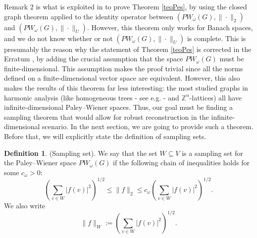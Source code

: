 \documentclass[12pt]{amsart}
\theoremstyle{definition}
\newtheorem{definition}[theorem]{Definition}
\numberwithin{equation}{section}
\theoremstyle{definition}
\theoremstyle{remark}
\numberwithin{equation}{section}
\begin{document}
Remark 2 is what is exploited in \cite{PW1} to prove Theorem \ref{teoPes}, by using the closed graph theorem applied to the identity operator between $(PW_\omega(G), \|\cdot\|_2)$ and $(PW_\omega(G), \|\cdot\|_U)$. However, this theorem only works for Banach spaces, and we do not know whether or not $(PW_\omega(G), \|\cdot\|_U)$ is complete. This is presumably the reason why the statement of Theorem \ref{teoPes} is corrected in the Erratum \cite{PW2}, by adding the crucial assumption that the space $PW_\omega(G)$ must be finite-dimensional. This assumption makes the proof trivial since all the norms defined on a finite-dimensional vector space are equivalent. However, this also makes the results of this theorem far less interesting: the most studied graphs in harmonic analysis (like homogeneous trees - see e.g. \cite{figa}- and $\mathbb{Z}^n$-lattices) all have infinite-dimensional Paley--Wiener spaces. Thus, our goal must be finding a sampling theorem that would allow for robust reconstruction in the infinite-dimensional scenario. In the next section, we are going to provide such a theorem. Before that, we will explicitly state the definition of sampling sets.

\begin{definition}
    (Sampling set). We say that the set $W \subseteq V$ is a sampling set for the Paley--Wiener space $PW_\omega(G)$ if the following chain of inequalities holds for some $c_\omega>0$:
    \begin{equation}
        \left(\sum_{v \in W}|f(v)|^2\right)^{1 / 2} \leq\|f\|_{2} \leq c_\omega\left(\sum_{v \in W}|f(v)|^2\right)^{1 / 2}.
    \end{equation}
    We also write
    $$
    \|f\|_{W} := \left(\sum_{v \in W}|f(v)|^2\right)^{1 / 2}.
    $$
\end{definition}
\end{document}
